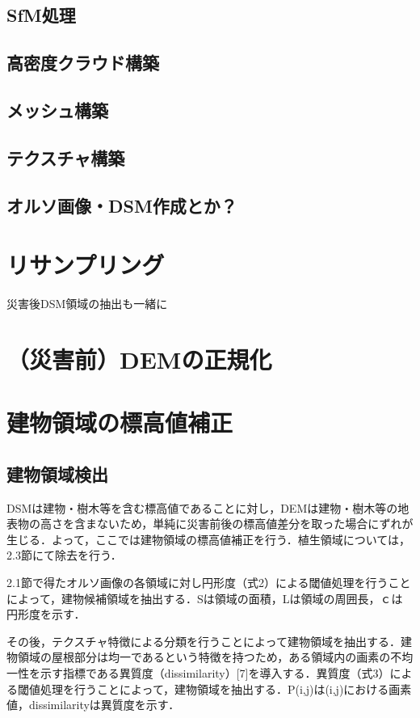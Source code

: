     \subsection{SfM処理}
    \subsection{高密度クラウド構築}
    \subsection{メッシュ構築}
    \subsection{テクスチャ構築}
    \subsection{オルソ画像・DSM作成とか？}
    

  \section{リサンプリング}
  災害後DSM領域の抽出も一緒に
  \section{（災害前）DEMの正規化}
  
  \section{建物領域の標高値補正}
    \subsection{建物領域検出}
      DSMは建物・樹木等を含む標高値であることに対し，DEMは建物・樹木等の地表物の高さを含まないため，単純に災害前後の標高値差分を取った場合にずれが生じる．よって，ここでは建物領域の標高値補正を行う．植生領域については，2.3節にて除去を行う．
  
      2.1節で得たオルソ画像の各領域に対し円形度（式2）による閾値処理を行うことによって，建物候補領域を抽出する．Sは領域の面積，Lは領域の周囲長，ｃは円形度を示す．
    
      その後，テクスチャ特徴による分類を行うことによって建物領域を抽出する．建物領域の屋根部分は均一であるという特徴を持つため，ある領域内の画素の不均一性を示す指標である異質度（dissimilarity）[7]を導入する．異質度（式3）による閾値処理を行うことによって，建物領域を抽出する．P(i,j)は(i,j)における画素値，dissimilarityは異質度を示す．

